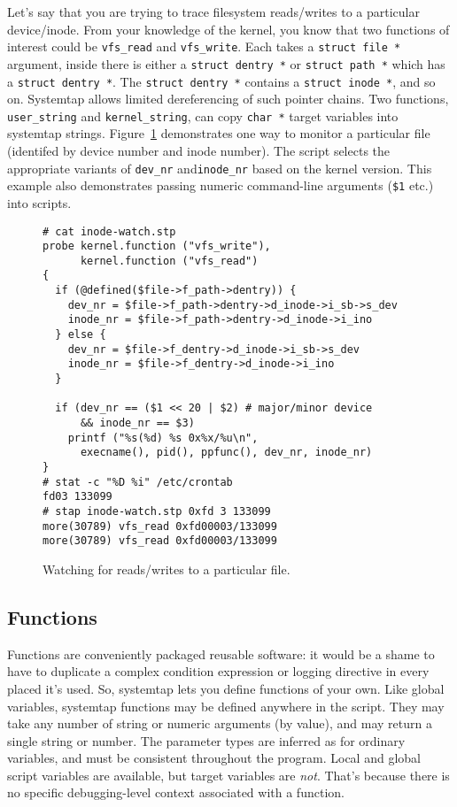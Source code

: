 \documentclass{article}
\newenvironment{boxedminipage}%
    {\begin{makeimage}\begin{center}\begin{Sbox}\begin{minipage}}%
    {\end{minipage}\end{Sbox}\fbox{\TheSbox}\end{center}\end{makeimage}}
\renewcommand{\nomenclature}[2]{}
\begin{document}
Let's say that you are trying to trace filesystem reads/writes to a
particular device/inode.  From your knowledge of the kernel, you know
that two functions of interest could be \verb+vfs_read+ and
\verb+vfs_write+.  Each takes a \verb+struct file *+ argument, inside
there is either a \verb+struct dentry *+ or \verb+struct path *+ which
has a \verb+struct dentry *+.
The \verb+struct dentry *+ contains a \verb+struct inode *+, and
so on.
Systemtap allows limited dereferencing of such pointer chains.
Two functions, \verb+user_string+ and \verb+kernel_string+, can copy
\verb+char *+ target variables into systemtap strings.
Figure~\ref{fig:inode-watch} demonstrates one way to monitor a
particular file (identifed by device number and inode number).
The script selects the appropriate variants of \verb+dev_nr+
and\verb+inode_nr+ based on the kernel version.
This example also demonstrates passing numeric command-line arguments
(\verb+$1+ etc.) into scripts.

\begin{figure}[!ht]
\begin{boxedminipage}{4.5in}
\begin{verbatim}
# cat inode-watch.stp
probe kernel.function ("vfs_write"),
      kernel.function ("vfs_read")
{
  if (@defined($file->f_path->dentry)) {
    dev_nr = $file->f_path->dentry->d_inode->i_sb->s_dev
    inode_nr = $file->f_path->dentry->d_inode->i_ino
  } else {
    dev_nr = $file->f_dentry->d_inode->i_sb->s_dev
    inode_nr = $file->f_dentry->d_inode->i_ino
  }

  if (dev_nr == ($1 << 20 | $2) # major/minor device
      && inode_nr == $3)
    printf ("%s(%d) %s 0x%x/%u\n",
      execname(), pid(), ppfunc(), dev_nr, inode_nr)
}
# stat -c "%D %i" /etc/crontab
fd03 133099
# stap inode-watch.stp 0xfd 3 133099
more(30789) vfs_read 0xfd00003/133099
more(30789) vfs_read 0xfd00003/133099
\end{verbatim}
\end{boxedminipage}
\caption{Watching for reads/writes to a particular file.}
\label{fig:inode-watch}
\end{figure}

\subsection{Functions}

Functions are conveniently packaged reusable software: it would be a
shame to have to duplicate a complex condition expression or logging
directive in every placed it's used.  So, systemtap lets you define
functions of your own.  Like global variables, systemtap functions may
be defined anywhere in the script.  They may take any number of string
or numeric arguments (by value), and may return a single string or
number.  The parameter types are inferred as for ordinary variables,
and must be consistent throughout the program.  Local and global
script variables are available, but target variables are {\em not}.
That's because there is no specific debugging-level context associated
with a function.
\nomenclature{function}{A clump of parametrized script statements that
may be repeatedly and recursively called from probe handlers and other
functions.}
\end{document}
